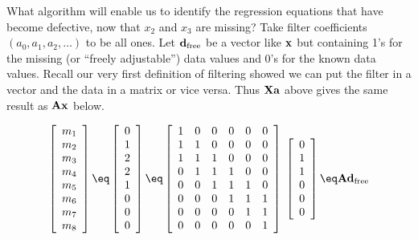\par
What algorithm will enable us to identify the regression equations
that have become defective, now that $x_2$ and $x_3$ are missing?
Take filter coefficients $(a_0, a_1, a_2,\ldots)$ to be all ones.
Let $\bold d_{\rm free}$ be a vector like $\bold x$ but containing 1's for
the missing (or ``freely adjustable'') data values and 0's for
the known data values.
Recall our very first definition of filtering showed we can put
the filter in a vector and the data in a matrix or vice versa.
Thus $\bold X \bold a$ above gives the same result as $\bold A \bold x$ below.



\begin{equation}
\left[
        \begin{array}{c}
          m_1 \\
          m_2 \\
          m_3 \\
          m_4 \\
          m_5 \\
          m_6 \\
          m_7 \\
          m_8
          \end{array}
\right]
\eq
\left[
        \begin{array}{c}
          0 \\
          1 \\
          2 \\
          2 \\
          1 \\
          0 \\
          0 \\
          0
          \end{array}
\right]
\eq
        \left[
        \begin{array}{cccccc}
          1   & 0   & 0 &0 &0  &0 \\
          1   & 1   & 0 &0 &0  &0 \\
          1   & 1   & 1 &0 &0  &0 \\
          0   & 1   & 1 &1 &0  &0 \\
          0   & 0   & 1 &1 &1  &0 \\
          0   & 0   & 0 &1 &1  &1 \\
          0   & 0   & 0 &0 &1  &1 \\
          0   & 0   & 0 &0 &0  &1   
          \end{array} \right]
        \; \left[
        \begin{array}{c}
          0 \\
          1 \\
          1 \\
          0 \\
          0 \\
          0 \end{array} \right]
\eq
	\bold A \bold d_{\rm free}
\label{eqn:twomissing}
\end{equation}
